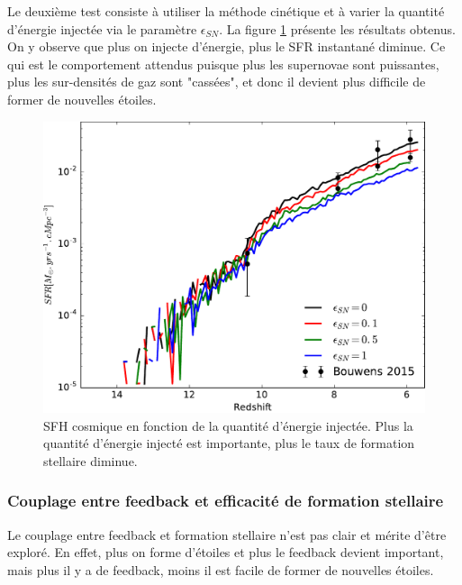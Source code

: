 Le deuxième test consiste à utiliser la méthode cinétique et à varier la quantité d'énergie injectée via le paramètre $\epsilon_{SN}$.
La figure \ref{fig:sfr_egy} présente les résultats obtenus.
On y observe que plus on injecte d'énergie, plus le \ac{SFR} instantané diminue.
Ce qui est le comportement attendus puisque plus les supernovae sont puissantes, plus les sur-densités de gaz sont "cassées", et donc il devient plus difficile de former de nouvelles étoiles.

\begin{figure}
        \includegraphics[width=.95\textwidth]{img/03/sedov/sneff_SFR.pdf} 
        \caption[SFH cosmique en fonction de la quantité d'énergie injectée]{SFH cosmique en fonction de la quantité d'énergie injectée. 
        Plus la quantité d'énergie injecté est importante, plus le taux de formation stellaire diminue.
        }
 		\label{fig:sfr_egy}
\end{figure}

\subsubsection{Couplage entre feedback et efficacité de formation stellaire}
\label{sec:feedsfr}

Le couplage entre feedback et formation stellaire n'est pas clair et mérite d'être exploré.
En effet, plus on forme d'étoiles et plus le feedback devient important, mais plus il y a de feedback, moins il est facile de former de nouvelles étoiles.

